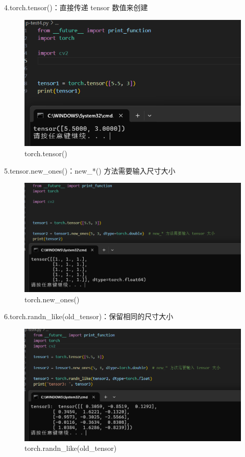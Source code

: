 \documentclass[a4paper, 12pt]{article}
\begin{document}
4.torch.tensor()：直接传递 tensor 数值来创建
\begin{figure}[H]
  \centering
  \includegraphics[width=\textwidth]{屏幕截图 2024-09-15 102342.png}
  \caption{torch.tensor()}
\end{figure}

5.tensor.new\_ones()：new\_*() 方法需要输入尺寸大小
\begin{figure}[H]
  \centering
  \includegraphics[width=\textwidth]{屏幕截图 2024-09-15 103948.png}
  \caption{torch.new\_ones()}
\end{figure}

6.torch.randn\_like(old\_tensor)：保留相同的尺寸大小
\begin{figure}[H]
  \centering
  \includegraphics[width=\textwidth]{屏幕截图 2024-09-15 104036.png}
  \caption{torch.randn\_like(old\_tensor)}
\end{figure}
\end{document}
